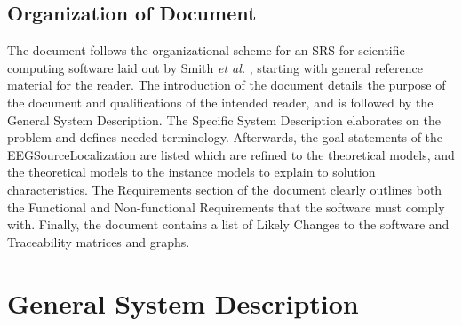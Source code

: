 \documentclass[12pt]{article}
\renewcommand{\progname}{EEGSourceLocalization}
\begin{document}
%

\subsection{Organization of Document}

The document follows the organizational scheme for an SRS for scientific computing software  laid out by Smith \textit{et al.}
\cite{SmithAndLai2005}, starting with general reference
material for the reader. The introduction of the document details the purpose of
the document and qualifications of the intended reader, and is followed by the General System Description. The Specific System Description elaborates on the problem and defines needed terminology. Afterwards, the goal statements  of the \progname{} are listed which are refined to the theoretical models, and the theoretical models to the instance models to explain to solution characteristics. The
Requirements section of the document clearly outlines both the Functional and
Non-functional Requirements that the software must comply with. Finally, the
document contains a list of Likely Changes to the software and Traceability
matrices and graphs.

\newpage

\section{General System Description}
\end{document}

